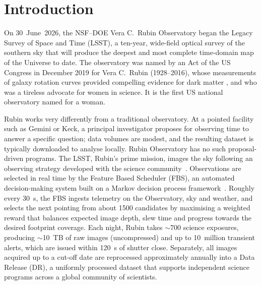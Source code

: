 \section{Introduction}
\label{sec:intro}

On 30~June~2026, the NSF--DOE Vera C.\ Rubin Observatory began the Legacy Survey of Space and Time (LSST), a ten-year, wide-field optical survey of the southern sky that will produce the deepest and most complete time-domain map of the Universe to date. 
The observatory was named by an Act of the US Congress in December 2019 for Vera C.\, Rubin (1928--2016), whose measurements of galaxy rotation curves provided compelling evidence for dark matter \citep[][]{1970ApJ...159..379R, 1980ApJ...238..471R}, and who was a tireless advocate for women in science.
It is the first US national observatory named for a woman.

Rubin works very differently from a traditional observatory. 
At a pointed facility such as Gemini or Keck, a principal investigator proposes for observing time to answer a specific question; data volumes are modest, and the resulting dataset is typically downloaded to analyse locally.
Rubin Observatory has no such proposal-driven programs.
The LSST, Rubin's prime mission, images the sky following an observing strategy developed with the science community~\cite{PSTN-055}.
Observations are selected in  real time by the Feature Based Scheduler (FBS), an automated decision-making system built on a Markov decision process framework~\cite{2026SPIE14151E..0XJ}.
Roughly every 30~s, the FBS ingests telemetry on the Observatory, sky and weather, and selects the next pointing from about 1500 candidates by maximising a weighted reward that balances expected image depth, slew time and progress towards the desired footprint coverage.
Each night, Rubin takes $\sim$700 science exposures, producing $\sim$10~TB of raw images (uncompressed) and up to 10~million transient alerts, which are issued within 120~s of shutter close.
Separately, all images acquired up to a cut-off date are reprocessed approximately annually into a Data Release (DR), a uniformly processed dataset that supports independent science programs across a global community of scientists.


